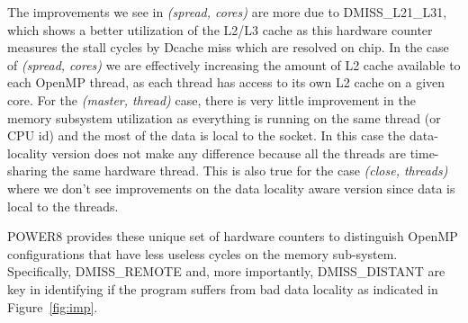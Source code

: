 The improvements we see in \textit{(spread, cores)} are more due to DMISS\_L21\_L31, which shows a better utilization of the L2/L3 cache as this hardware counter measures the stall cycles by Dcache miss which are resolved on chip. 
In the case of  \textit{(spread, cores)} we are effectively increasing the amount of 
L2 cache available to each OpenMP thread, as each thread has access to its own L2 cache on a given core. 
For the \textit{(master, thread)} case, there is very little improvement in the memory subsystem utilization as everything is running on the same thread (or CPU id) and the most of the data is local to the socket. In this case the data-locality version does not make any difference because all the threads are time-sharing the same hardware thread. This is also true for the case  \textit{(close, threads)} where
 we don't see improvements on the data locality aware version since data is local to the threads. 

POWER8 provides these unique set of hardware counters to distinguish OpenMP configurations that have less useless cycles on the memory sub-system. Specifically, DMISS\_REMOTE and, more importantly, DMISS\_DISTANT are key in identifying if the program suffers from bad data locality as indicated in Figure~\ref{fig:imp}.



